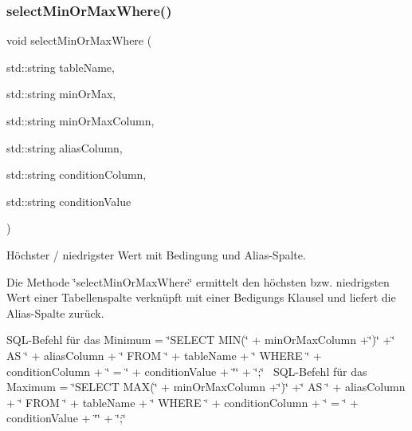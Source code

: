 \subsubsection{select\+Min\+Or\+Max\+Where()}
{\footnotesize\ttfamily void select\+Min\+Or\+Max\+Where (\begin{DoxyParamCaption}\item[{std\+::string}]{table\+Name,  }\item[{std\+::string}]{min\+Or\+Max,  }\item[{std\+::string}]{min\+Or\+Max\+Column,  }\item[{std\+::string}]{alias\+Column,  }\item[{std\+::string}]{condition\+Column,  }\item[{std\+::string}]{condition\+Value }\end{DoxyParamCaption})}



Höchster / niedrigster Wert mit Bedingung und Alias-\/\+Spalte. 

Die Methode \char`\"{}select\+Min\+Or\+Max\+Where\char`\"{} ermittelt den höchsten bzw. niedrigsten Wert einer Tabellenspalte verknüpft mit einer Bedigungs Klausel und liefert die Alias-\/\+Spalte zurück.~\newline


S\+Q\+L-\/\+Befehl für das Minimum = \char`\"{}\+S\+E\+L\+E\+C\+T M\+I\+N(\char`\"{} + min\+Or\+Max\+Column +\char`\"{})\char`\"{} +\char`\"{} A\+S \char`\"{} + alias\+Column + \char`\"{} F\+R\+O\+M \char`\"{} + table\+Name + \char`\"{} W\+H\+E\+R\+E \char`\"{} + condition\+Column + \char`\"{} = \textquotesingle{}\char`\"{} + condition\+Value + \char`\"{}\textquotesingle{}\char`\"{} + \char`\"{};\char`\"{}~\newline
 S\+Q\+L-\/\+Befehl für das Maximum = \char`\"{}\+S\+E\+L\+E\+C\+T M\+A\+X(\char`\"{} + min\+Or\+Max\+Column +\char`\"{})\char`\"{} +\char`\"{} A\+S \char`\"{} + alias\+Column + \char`\"{} F\+R\+O\+M \char`\"{} + table\+Name + \char`\"{} W\+H\+E\+R\+E \char`\"{} + condition\+Column + \char`\"{} = \textquotesingle{}\char`\"{} + condition\+Value + \char`\"{}\textquotesingle{}\char`\"{} + \char`\"{};\char`\"{}



